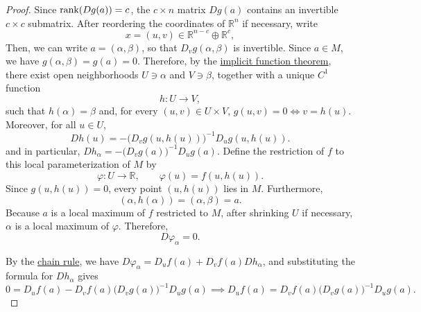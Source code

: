 	\begin{proof}
		Since $\operatorname{rank}(Dg(a))=c$, the $c\times n$ matrix $Dg(a)$ contains an invertible $c\times c$ submatrix. After reordering the coordinates of $\mathbb{R}^n$ if necessary, write
		\begin{equation}
			x = (u, v) \in \mathbb{R}^{n - c} \oplus \mathbb{R}^c,
		\end{equation}
		Then, we can write $a = (\alpha, \beta)$, so that $D_vg(\alpha,\beta)$ is invertible. Since $a \in M$, we have $g(\alpha,\beta)=g(a)=0$. Therefore, by the \hyperref[thm:implicit-function-theorem]{implicit function theorem}, there exist open neighborhoods $U\ni\alpha$ and $V\ni\beta$, together with a unique $C^1$ function
		\begin{equation}
			h: U \to V,
		\end{equation}
		such that $h(\alpha) = \beta$ and, for every $(u, v)\in U \times V$, $g(u,v)=0 \iff v=h(u)$. Moreover, for all $u \in U$, 
		\begin{equation}
			Dh(u) = -\bigl(D_vg(u,h(u))\bigr)^{-1} D_ug(u,h(u)).
		\end{equation}
		and in particular, $Dh_\alpha = -\bigl(D_vg(a)\bigr)^{-1}D_ug(a)$. Define the restriction of $f$ to this local parameterization of $M$ by
		\begin{equation}
			\varphi: U \to \mathbb{R}, \qquad \varphi(u)=f(u, h(u)).
		\end{equation}
		Since $g(u,h(u))=0$, every point $(u,h(u))$ lies in $M$. Furthermore,
		\begin{equation}
			(\alpha,h(\alpha)) = (\alpha,\beta) = a.
		\end{equation}
		Because $a$ is a local maximum of $f$ restricted to $M$, after shrinking $U$ if necessary, $\alpha$ is a local maximum of $\varphi$. Therefore,
		\begin{equation}
			D\varphi_\alpha=0.
		\end{equation}

		By the \hyperref[thm:chain-rule]{chain rule}, we have $D\varphi_\alpha = D_uf(a)+D_vf(a)Dh_\alpha$, and substituting the formula for $Dh_\alpha$ gives
		\begin{equation}
			0 = D_uf(a) - D_vf(a)\bigl(D_vg(a)\bigr)^{-1}D_ug(a) \implies D_uf(a) = D_vf(a)\bigl(D_vg(a)\bigr)^{-1}D_ug(a).
		\end{equation}


\end{proof}
